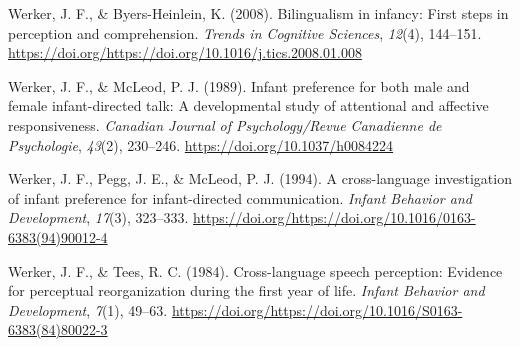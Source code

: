 \documentclass[
  english,
  ,man,floatsintext]{apa6}
\begin{document}
\leavevmode\hypertarget{ref-werker_2008}{}%
Werker, J. F., \& Byers-Heinlein, K. (2008). Bilingualism in infancy: First steps in perception and comprehension. \emph{Trends in Cognitive Sciences}, \emph{12}(4), 144--151. \url{https://doi.org/https://doi.org/10.1016/j.tics.2008.01.008}

\leavevmode\hypertarget{ref-werker_1989}{}%
Werker, J. F., \& McLeod, P. J. (1989). Infant preference for both male and female infant-directed talk: A developmental study of attentional and affective responsiveness. \emph{Canadian Journal of Psychology/Revue Canadienne de Psychologie}, \emph{43}(2), 230--246. \url{https://doi.org/10.1037/h0084224}

\leavevmode\hypertarget{ref-werker_1994}{}%
Werker, J. F., Pegg, J. E., \& McLeod, P. J. (1994). A cross-language investigation of infant preference for infant-directed communication. \emph{Infant Behavior and Development}, \emph{17}(3), 323--333. \url{https://doi.org/https://doi.org/10.1016/0163-6383(94)90012-4}

\leavevmode\hypertarget{ref-werker_1984}{}%
Werker, J. F., \& Tees, R. C. (1984). Cross-language speech perception: Evidence for perceptual reorganization during the first year of life. \emph{Infant Behavior and Development}, \emph{7}(1), 49--63. \url{https://doi.org/https://doi.org/10.1016/S0163-6383(84)80022-3}

\endgroup


\clearpage
\makeatletter
\efloat@restorefloats
\makeatother
\end{document}
